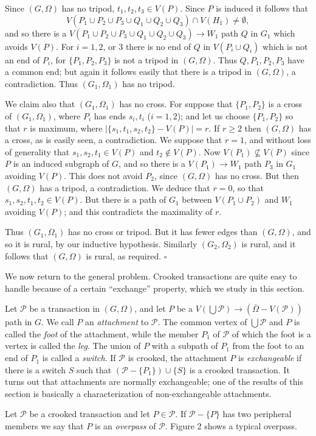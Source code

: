 Since $(G, \Omega)$ has no tripod, $t_1, t_2, t_3 \in V(P)$. Since $P$ is induced it follows that
\begin{equation*}
V(P_1 \cup P_2 \cup P_3 \cup Q_1 \cup Q_2 \cup Q_3) \cap V(H_1) \ne \emptyset,
\end{equation*}
and so there is a $V(P_1 \cup P_2 \cup P_3 \cup Q_1 \cup Q_2 \cup Q_3) \to W_1$ path $Q$ in $G_1$ which avoids $V(P)$. For $i = 1, 2$, or $3$ there is no end of $Q$ in $V(P_i \cup Q_i)$ which is not an end of $P_i$, for $\{P_1, P_2, P_3\}$ is not a tripod in $(G, \Omega)$. Thus $Q, P_1, P_2, P_3$ have a common end; but again it follows easily that there is a tripod in $(G, \Omega)$, a contradiction. Thus $(G_1, \Omega_1)$ has no tripod.

We claim also that $(G_1, \Omega_1)$ has no cross. For suppose that $\{P_1, P_2\}$ is a cross of $(G_1, \Omega_1)$, where $P_i$ has ends $s_i, t_i$ ($i = 1, 2$); and let us choose $\{P_1, P_2\}$ so that $r$ is maximum, where $|\{s_1, t_1, s_2, t_2\} - V(P)| = r$. If $r \ge 2$ then $(G, \Omega)$ has a cross, as is easily seen, a contradiction. We suppose that $r = 1$, and without loss of generality that $s_1, s_2, t_1 \in V(P)$ and $t_2 \notin V(P)$. Now $V(P_1) \not\subseteq V(P)$ since $P$ is an induced subgraph of $G$, and so there is a $V(P_1) \to W_1$ path $P_3$ in $G_1$ avoiding $V(P)$. This does not avoid $P_2$, since $(G, \Omega)$ has no cross. But then $(G, \Omega)$ has a tripod, a contradiction. We deduce that $r = 0$, so that $s_1, s_2, t_1, t_2 \in V(P)$. But there is a path of $G_1$ between $V(P_1 \cup P_2)$ and $W_1$ avoiding $V(P)$; and this contradicts the maximality of $r$.

Thus $(G_1, \Omega_1)$ has no cross or tripod. But it has fewer edges than $(G, \Omega)$, and so it is rural, by our inductive hypothesis. Similarly $(G_2, \Omega_2)$ is rural, and it follows that $(G, \Omega)$ is rural, as required. $\square$


We now return to the general problem. Crooked transactions are quite easy to handle because of a certain ``exchange'' property, which we study in this section.

Let $\mathscr{P}$ be a transaction in $(G, \Omega)$, and let $P$ be a $V(\bigcup \mathscr{P}) \to (\bar{\Omega} - V(\mathscr{P}))$ path in $G$. We call $P$ an \textit{attachment} to $\mathscr{P}$. The common vertex of $\bigcup \mathscr{P}$ and $P$ is called the \textit{foot} of the attachment, while the member $P_1$ of $\mathscr{P}$ of which the foot is a vertex is called the \textit{leg}. The union of $P$ with a subpath of $P_1$ from the foot to an end of $P_1$ is called a \textit{switch}. If $\mathscr{P}$ is crooked, the attachment $P$ is \textit{exchangeable} if there is a switch $S$ such that $(\mathscr{P} - \{P_1\}) \cup \{S\}$ is a crooked transaction. It turns out that attachments are normally exchangeable; one of the results of this section is basically a characterization of non-exchangeable attachments.

Let $\mathscr{P}$ be a crooked transaction and let $P \in \mathscr{P}$. If $\mathscr{P} - \{P\}$ has two peripheral members we say that $P$ is an \textit{overpass} of $\mathscr{P}$. Figure 2 shows a typical overpass.
